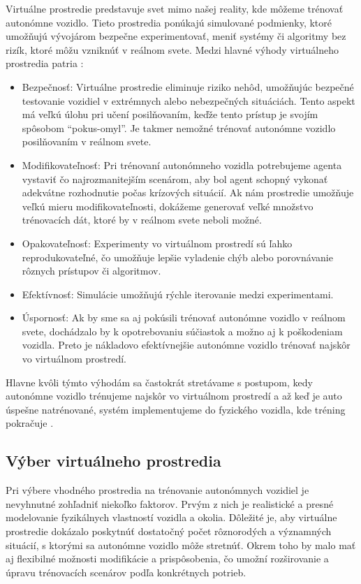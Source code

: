 Virtuálne prostredie predstavuje svet mimo našej reality, kde môžeme trénovať autonómne vozidlo. Tieto prostredia ponúkajú simulované podmienky, ktoré umožňujú vývojárom bezpečne experimentovať, meniť systémy či algoritmy bez rizík, ktoré môžu vzniknúť v reálnom svete. Medzi hlavné výhody virtuálneho prostredia patria \cite{ai_in_games_brief_review}:

\begin{itemize}
\item  Bezpečnosť: Virtuálne prostredie eliminuje riziko nehôd, umožňujúc bezpečné testovanie vozidiel v extrémnych alebo nebezpečných situáciách. Tento aspekt má veľkú úlohu pri učení posilňovaním, keďže tento prístup je svojím spôsobom “pokus-omyl”. Je takmer nemožné trénovať autonómne vozidlo posilňovaním v reálnom svete. 
\item  Modifikovateľnosť: Pri trénovaní autonómneho vozidla potrebujeme agenta vystaviť čo najrozmanitejším scenárom, aby bol agent schopný vykonať adekvátne rozhodnutie počas krízových situácií. Ak nám prostredie umožňuje veľkú mieru modifikovateľnosti, dokážeme generovať veľké množstvo trénovacích dát, ktoré by v reálnom svete neboli možné.
\item  Opakovateľnosť: Experimenty vo virtuálnom prostredí sú ľahko reprodukovateľné, čo umožňuje lepšie vyladenie chýb alebo porovnávanie rôznych prístupov či algoritmov.
\item  Efektívnosť: Simulácie umožňujú rýchle iterovanie medzi experimentami. 
\item  Úspornosť: Ak by sme sa aj pokúsili trénovať autonómne vozidlo v reálnom svete, dochádzalo by k opotrebovaniu súčiastok a možno aj k poškodeniam vozidla. Preto je nákladovo efektívnejšie autonómne vozidlo trénovať najskôr vo virtuálnom prostredí.
\end{itemize}

Hlavne kvôli týmto výhodám sa častokrát stretávame s postupom, kedy autonómne vozidlo trénujeme najskôr vo virtuálnom prostredí a až keď je auto úspešne natrénované, systém implementujeme do fyzického vozidla, kde tréning pokračuje \cite{ai_in_games_brief_review}.

\subsection{Výber virtuálneho prostredia}

Pri výbere vhodného prostredia na trénovanie autonómnych vozidiel je nevyhnutné zohľadniť niekoľko faktorov. Prvým z nich je realistické a presné modelovanie fyzikálnych vlastností vozidla a okolia. Dôležité je, aby virtuálne prostredie dokázalo poskytnúť dostatočný počet rôznorodých a významných situácií, s ktorými sa autonómne vozidlo môže stretnúť. Okrem toho by malo mať aj flexibilné možnosti modifikácie a prispôsobenia, čo umožní rozširovanie a úpravu trénovacích scenárov podľa konkrétnych potrieb. \cite{ai_in_games_brief_review}

